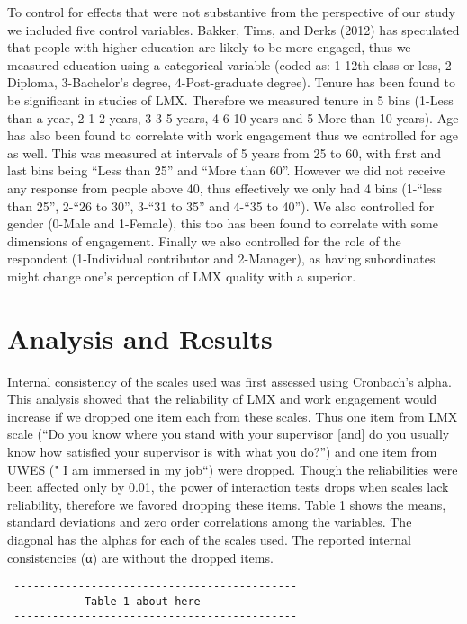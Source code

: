 To control for effects that were not substantive from the perspective of
our study we included five control variables. Bakker, Tims, and Derks
(2012) has speculated that people with higher education are likely to be
more engaged, thus we measured education using a categorical variable
(coded as: 1-12th class or less, 2-Diploma, 3-Bachelor's degree,
4-Post-graduate degree). Tenure has been found to be significant in
studies of LMX. Therefore we measured tenure in 5 bins (1-Less than a
year, 2-1-2 years, 3-3-5 years, 4-6-10 years and 5-More than 10 years).
Age has also been found to correlate with work engagement thus we
controlled for age as well. This was measured at intervals of 5 years
from 25 to 60, with first and last bins being ``Less than 25'' and
``More than 60''. However we did not receive any response from people
above 40, thus effectively we only had 4 bins (1-``less than 25'',
2-``26 to 30'', 3-``31 to 35'' and 4-``35 to 40''). We also controlled
for gender (0-Male and 1-Female), this too has been found to correlate
with some dimensions of engagement. Finally we also controlled for the
role of the respondent (1-Individual contributor and 2-Manager), as
having subordinates might change one's perception of LMX quality with a
superior.

\section{Analysis and Results}\label{analysis-and-results}

Internal consistency of the scales used was first assessed using
Cronbach's alpha. This analysis showed that the reliability of LMX and
work engagement would increase if we dropped one item each from these
scales. Thus one item from LMX scale (``Do you know where you stand with
your supervisor {[}and{]} do you usually know how satisfied your
supervisor is with what you do?'') and one item from UWES (" I am
immersed in my job``) were dropped. Though the reliabilities were been
affected only by 0.01, the power of interaction tests drops when scales
lack reliability, therefore we favored dropping these items. Table 1
shows the means, standard deviations and zero order correlations among
the variables. The diagonal has the alphas for each of the scales used.
The reported internal consistencies (α) are without the dropped items.

\begin{verbatim}
 --------------------------------------------
            Table 1 about here               
 --------------------------------------------
\end{verbatim}

